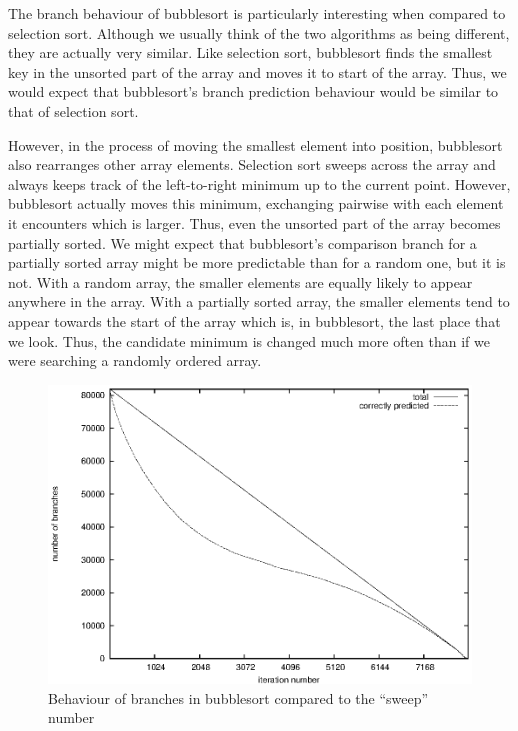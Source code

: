 \documentclass[acmtocl]{acmtrans2m}
\begin{document}
The branch behaviour of bubblesort is particularly interesting when
compared to selection sort. Although we usually think of the two
algorithms as being different, they are actually very similar. Like
selection sort, bubblesort finds the smallest key in the
unsorted part of the array and moves it to start of the
array. Thus, we would expect that bubblesort's branch prediction
behaviour would be similar to that of selection sort.

However, in the process of moving the smallest element into position,
bubblesort also rearranges other array elements. Selection sort sweeps
across the array and always keeps track of the left-to-right minimum
up to the current point.  However, bubblesort actually moves this
minimum, exchanging pairwise with each element it encounters which is
larger. Thus, even the unsorted part of the array becomes partially
sorted. We might expect that bubblesort's comparison branch for a
partially sorted array might be more predictable than for a random
one, but it is not. With a random array, the smaller elements are
equally likely to appear anywhere in the array. With a partially
sorted array, the smaller elements tend to appear towards the start of
the array which is, in bubblesort, the last place that we look. Thus,
the candidate minimum is changed much more often than if we were
searching a randomly ordered array.

\begin{figure}[h]
\includegraphics{plots/bpred_bubble_progress.eps}
\caption{Behaviour of branches in bubblesort compared to the ``sweep'' number}
\label{Predictability-of-branches-in-bubblesort-compared-to-sweep-number}
\end{figure}
\end{document}
